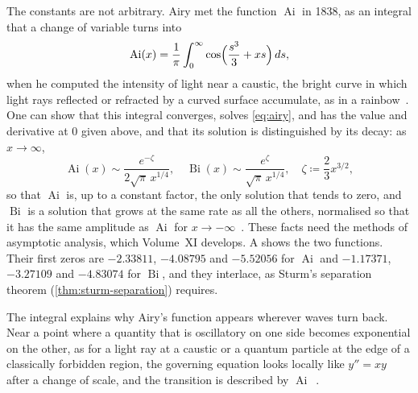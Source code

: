 The constants are not arbitrary. Airy met the function $\operatorname{Ai}$ in 1838, as an integral that a change of variable turns into
\[
\operatorname{Ai}(x)=\frac1\pi\int_0^\infty\cos\Bigl(\frac{s^3}3+xs\Bigr)\,ds ,
\]
when he computed the intensity of light near a caustic, the bright curve in which light rays reflected or refracted by a curved surface accumulate, as in a rainbow~\cite{airy1838}. One can show that this integral converges, solves \eqref{eq:airy}, and has the value and derivative at $0$ given above, and that its solution is distinguished by its decay: as $x\to\infty$,
\[
\operatorname{Ai}(x)\sim\frac{e^{-\zeta}}{2\sqrt\pi\,x^{1/4}},\quad\operatorname{Bi}(x)\sim\frac{e^{\zeta}}{\sqrt\pi\,x^{1/4}},\quad\zeta\coloneqq\frac23x^{3/2},
\]
so that $\operatorname{Ai}$ is, up to a constant factor, the only solution that tends to zero, and $\operatorname{Bi}$ is a solution that grows at the same rate as all the others, normalised so that it has the same amplitude as $\operatorname{Ai}$ for $x\to-\infty$~\cite[Chap.~9]{olver2010nist}. These facts need the methods of asymptotic analysis, which Volume~XI develops. A shows the two functions. Their first zeros are $-2.33811$, $-4.08795$ and $-5.52056$ for $\operatorname{Ai}$ and $-1.17371$, $-3.27109$ and $-4.83074$ for $\operatorname{Bi}$, and they interlace, as Sturm's separation theorem (\cref{thm:sturm-separation}) requires.

The integral explains why Airy's function appears wherever waves turn back. Near a point where a quantity that is oscillatory on one side becomes exponential on the other, as for a light ray at a caustic or a quantum particle at the edge of a classically forbidden region, the governing equation looks locally like $y''=xy$ after a change of scale, and the transition is described by $\operatorname{Ai}$~\cite{vallee2004}.

